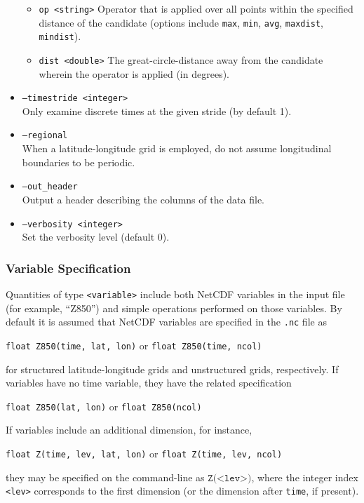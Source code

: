 \documentclass[gmdd, hvmath, online]{copernicus_discussions}
\begin{document}
\begin{itemize}
\begin{itemize}
\item[] \texttt{op <string>}  Operator that is applied over all points within the specified distance of the candidate (options include \texttt{max}, \texttt{min}, \texttt{avg}, \texttt{maxdist}, \texttt{mindist}).
\item[] \texttt{dist <double>}  The great-circle-distance away from the candidate wherein the operator is applied (in degrees).
\end{itemize}
\item[] \texttt{--timestride <integer>} \\ Only examine discrete times at the given stride (by default 1).
\item[] \texttt{--regional} \\ When a latitude-longitude grid is employed, do not assume longitudinal boundaries to be periodic.
\item[] \texttt{--out\_header} \\ Output a header describing the columns of the data file.
\item[] \texttt{--verbosity <integer>} \\ Set the verbosity level (default 0).
\end{itemize}

\subsubsection{Variable Specification} \label{sec:VariableSpecification}

Quantities of type \texttt{<variable>} include both NetCDF variables in the input file (for example, ``Z850'') and simple operations performed on those variables.  By default it is assumed that NetCDF variables are specified in the \texttt{.nc} file as
\begin{center}
\texttt{float Z850(time, lat, lon)} \quad or \quad \texttt{float Z850(time, ncol)}
\end{center} for structured latitude-longitude grids and unstructured grids, respectively.  If variables have no time variable, they have the related specification
\begin{center}
\texttt{float Z850(lat, lon)} \quad or \quad \texttt{float Z850(ncol)}
\end{center}  If variables include an additional dimension, for instance,
\begin{center}
\texttt{float Z(time, lev, lat, lon)} \quad or \quad \texttt{float Z(time, lev, ncol)}
\end{center} they may be specified on the command-line as $\texttt{Z(<lev>)}$, where the integer index \texttt{<lev>} corresponds to the first dimension (or the dimension after \texttt{time}, if present).  
\end{document}
